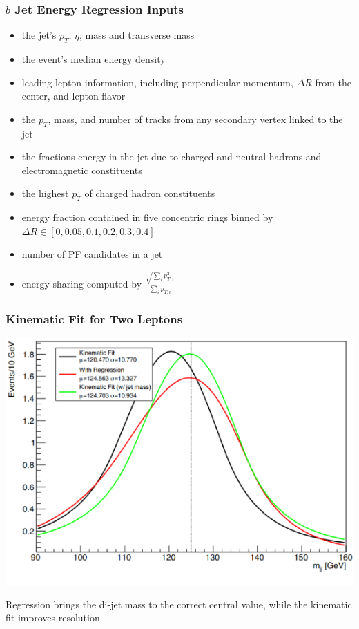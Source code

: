 \documentclass{beamer}
\begin{document}
\begin{frame}
  \frametitle{$b$ Jet Energy Regression Inputs}

  \begin{itemize}
  \item the jet's $p_T$, $\eta$, mass and transverse mass
  \item the event's median energy density
  \item leading lepton information,
    including perpendicular momentum,
    $\Delta R$ from the center,
    and lepton flavor
  \item the $p_T$, mass, and number of tracks from any secondary vertex linked to the jet
  \item the fractions energy in the jet due to
    charged and neutral hadrons and electromagnetic constituents
  \item the highest $p_T$ of charged hadron constituents
  \item energy fraction contained in five concentric rings
    binned by $\Delta R \in [0, 0.05, 0.1, 0.2, 0.3, 0.4]$
  \item number of PF candidates in a jet
  \item energy sharing computed by
    $\frac{\sqrt{\sum_i p_{T,i}^2}}{\sum_i p_{T,i}}$
  \end{itemize}

\end{frame}

\begin{frame}
  \frametitle{Kinematic Fit for Two Leptons}

  \begin{center}
    \includegraphics[width=0.7\linewidth]{figures/Screenshot_2020-11-30_20-55-31.png}
  \end{center}

  Regression brings the di-jet mass to the correct central value,
  while the kinematic fit improves resolution

\end{frame}
\end{document}
